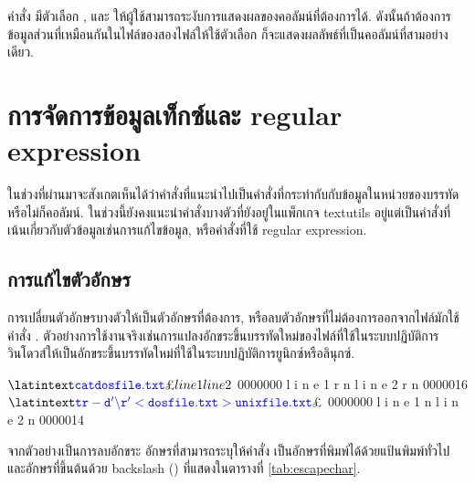 \begin{thwbr}
คำสั่ง  มีตัวเลือก ,  และ  ให้ผู้ใช้สามารถระงับการแสดงผลของคอลัมน์ที่ต้องการได้. ดังนั้นถ้าต้องการข้อมูลส่วนที่เหมือนกันในไฟล์ของสองไฟล์ให้ใช้ตัวเลือก  ก็จะแสดงผลลัพธ์ที่เป็นคอลัมน์ที่สามอย่างเดียว.




\section{การจัดการข้อมูลเท็กซ์และ regular expression}
ในช่วงที่ผ่านมาจะสังเกตเห็นได้ว่าคำสั่งที่แนะนำไปเป็นคำสั่งที่กระทำกับกับข้อมูลในหน่วยของบรรทัดหรือไม่ก็คอลัมน์. ในช่วงนี้ยังคงแนะนำคำสั่งบางตัวที่ยังอยู่ในแพ็กเกจ textutils อยู่แต่เป็นคำสั่งที่เน้นเกี่ยวกับตัวข้อมูลเช่นการแก้ไขข้อมูล, หรือคำสั่งที่ใช้ regular expression. 


\subsection{การแก้ไขตัวอักษร}\label{sec:tr}
การเปลี่ยนตัวอักษรบางตัวให้เป็นตัวอักษรที่ต้องการ, หรือลบตัวอักษรที่ไม่ต้องการออกจากไฟล์มักใช้คำสั่ง . ตัวอย่างการใช้งานจริงเช่นการแปลงอักขระขึ้นบรรทัดใหม่ของไฟล์ที่ใช้ในระบบปฏิบัติการวินโดวส์ให้เป็นอักขระขึ้นบรรทัดใหม่ที่ใช้ในระบบปฏิบัติการยูนิกซ์หรือลินุกซ์.
\begin{MyExample}
\begin{MyEx}
$ \cin{cat dosfile.txt}
line1
line2
$  
0000000   l   i   n   e   1  \bs{}r  \bs{}n   l   i   n   e   2  \bs{}r  \bs{}n
0000016
$ \cin{tr -d '\bs{}r' < dosfile.txt > unixfile.txt}
$ 
0000000   l   i   n   e   1  \bs{}n   l   i   n   e   2  \bs{}n
0000014
\end{MyEx}
\end{MyExample}
จากตัวอย่างเป็นการลบอักขระ  อักษรที่สามารถระบุให้คำสั่ง  เป็นอักษรที่พิมพ์ได้ด้วยแป้นพิมพ์ทั่วไปและอักษรที่ขึ้นต้นด้วย backslash (\cmd{\bs}) ที่แสดงในตารางที่ \ref{tab:escapechar}. 


\end{thwbr}
